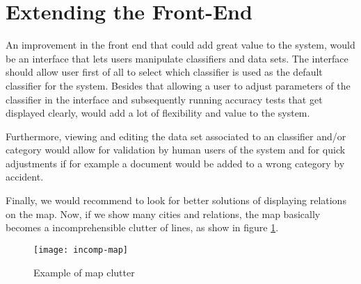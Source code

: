 \section{Extending the Front-End}
An improvement in the front end that could add great value to the system, would be an interface that lets users manipulate classifiers and data sets. The interface should allow user first of all to select which classifier is used as the default classifier for the system. Besides that allowing a user to adjust parameters of the classifier in the interface and subsequently running accuracy tests that get displayed clearly, would add a lot of flexibility and value to the system.

Furthermore, viewing and editing the data set associated to an classifier and/or category would allow for validation by human users of the system and for quick adjustments if for example a document would be added to a wrong category by accident.

Finally, we would recommend to look for better solutions of displaying relations on the map. Now, if we show many cities and relations, the map basically becomes a incomprehensible clutter of lines, as show in figure \ref{fig:incomp-map}.

\begin{figure}[H]
\centering
\texttt{[image: incomp-map]}
\caption{Example of map clutter}
\label{fig:incomp-map}
\end{figure}